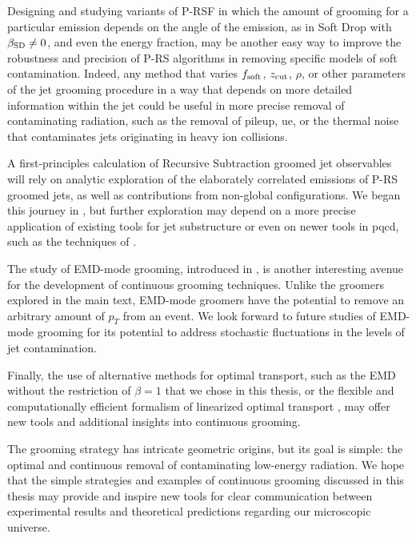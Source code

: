 Designing and studying variants of P-RSF in which the amount of grooming for a particular emission depends on the angle of the emission, as in Soft Drop with \(\beta_{\rm SD} \neq 0\), and even the energy fraction, may be another easy way to improve the robustness and precision of P-RS algorithms in removing specific models of soft contamination.
%
Indeed, any method that varies \(f_{\rm soft}\), \(z_{\rm cut}\), \(\rho\), or other parameters of the jet grooming procedure in a way that depends on more detailed information within the jet could be useful in more precise removal of contaminating radiation, such as the removal of \gls{pileup}, \gls{ue}, or the thermal noise that contaminates jets originating in heavy ion collisions.

   A first-principles calculation of Recursive Subtraction groomed jet observables will rely on analytic exploration of the elaborately correlated emissions of P-RS groomed jets, as well as contributions from non-global configurations.
%
We began this journey in , but further exploration may depend on a more precise application of existing tools for jet substructure or even on newer tools in \gls{pqcd}, such as the techniques of .

The study of EMD-mode \PIRANHA{} grooming, introduced in , is another interesting avenue for the development of continuous grooming techniques.
%
Unlike the \PIRANHA{} groomers explored in the main text, EMD-mode \PIRANHA{} groomers have the potential to remove an arbitrary amount of \(p_T\) from an event.
%
We look forward to future studies of EMD-mode grooming for its potential to address stochastic fluctuations in the levels of jet contamination.

Finally, the use of alternative methods for optimal transport, such as the EMD without the restriction of \(\beta = 1\) that we chose in this thesis, or the flexible and computationally efficient formalism of linearized optimal transport \cite{Cai:2020vzx,Cai:2021hnn,cai2022linearized,sarrazin2023linearized}, may offer new tools and additional insights into continuous grooming.

The \PIRANHA{} grooming strategy has intricate geometric origins, but its goal is simple: the optimal and continuous removal of contaminating low-energy radiation.
%
We hope that the simple strategies and examples of continuous grooming discussed in this thesis may provide and inspire new tools for clear communication between experimental results and theoretical predictions regarding our microscopic universe.


